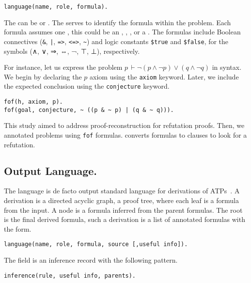 \documentclass[../main.tex]{subfiles}
\begin{document}
\begin{verbatim}
language(name, role, formula).
\end{verbatim}

The  can be  or . The 
serves to identify the formula within the problem. Each formula
assumes one , this could be an ,
, , or a .
The formulas include Boolean connectives (\verb!&!, \verb!|!,
\verb!=>!, \verb!<=>!, \verb!~!) and logic constants \verb!$true!
and \verb!$false!, for the symbols (∧, ∨, ⇒, ⇔, ¬, ⊤, ⊥), respectively.

For instance, let us express the problem
$p\, \vdash \neg (p \wedge \neg p) ∨ (q \wedge \neg q)$
in \TPTP syntax. We begin by declaring the $p$ axiom using the \verb!axiom!
keyword. Later, we include the expected conclusion using the \verb!conjecture!
keyword.

\begin{verbatim}
fof(h, axiom, p).
fof(goal, conjecture, ~ ((p & ~ p) | (q & ~ q))).
\end{verbatim}

This study aimed to address proof-reconstruction for refutation
proofs. Then, we annotated  problems using \verb!fof! formulas.
\Metis converts  formulas to  clauses to look for a
refutation.

\subsection{Output Language.}
\label{ssec:output-language}

The \TSTP language is de facto output standard language
for derivations of ATPs~\cite{Sutcliffe-Schulz-Claessen-VanGelder-2006,Sicard-Ramirez2016}.
A \TSTP derivation is a directed acyclic graph, a proof tree,
where each leaf is a formula from the \TPTP input. A node is a formula
inferred from the parent formulas. The root is the final derived formula,
such a derivation is a list of annotated formulas with the form.

\begin{verbatim}
language(name, role, formula, source [,useful info]).
\end{verbatim}

The  field is an inference record with the following
pattern.

\begin{verbatim}
inference(rule, useful info, parents).
\end{verbatim}
\end{document}
